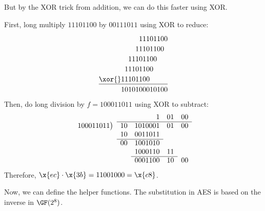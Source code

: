 \documentclass[class=co487,tikz,minted,notes]{agony}
\begin{document}
But by the XOR trick from addition, we can do this faster using XOR.

\begin{example}
  First, long multiply $11101100$ by $00111011$ using XOR to reduce:
  \[
    \setlength\arraycolsep{0pt}
    \setlength\extrarowheight{2pt}
    \begin{array}[t]{rrl}
               &       & 11101100 \\
               & 1     & 1101100  \\
               & 111   & 01100    \\
               & 1110  & 1100     \\
      {}\xor{} & 11101 & 100      \\ \hline
               & 10101 & 00010100
    \end{array}
  \]
  Then, do long division by $f = 100011011$ using XOR to subtract:
  \[
    \begin{array}[t]{rrrrr}
      \setlength\arraycolsep{0pt}
      \setlength\extrarowheight{2pt}
                       &    & 1       & 01 & 00 \\ \cline{2-5}
      100011011 \bigl) & 10 & 1010001 & 01 & 00 \\
                       & 10 & 0011011 &         \\ \cline{2-3}
                       & 00 & 1001010 &         \\
                       &    & 1000110 & 11      \\ \cline{3-4}
                       &    & 0001100 & 10 & 00
    \end{array}
  \]
  Therefore, $\x{ec} \cdot \x{3b} = 11001000 = \x{c8}$.
\end{example}

Now, we can define the helper functions.
The substitution in AES is based on the inverse in $\GF(2^8)$.
\end{document}
